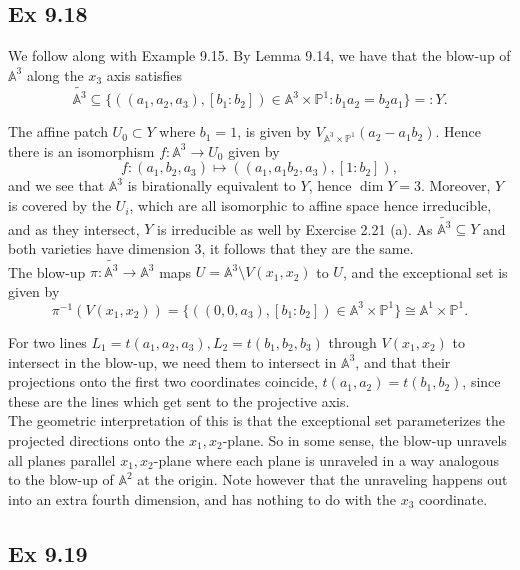 \documentclass{article}
\theoremstyle{definition}
\renewcommand{\P}{\mathbb{P}}
\newcommand{\A}{\mathbb{A}}
\renewcommand{\AA}[1]{\A^{#1}}
\newcommand{\PP}[1]{\P^{#1}}
\begin{document}
\subsection*{Ex 9.18}

We follow along with Example 9.15. By Lemma 9.14, we have that the blow-up of
$\AA{3}$ along the $x_3$ axis satisfies 
\[
	\widetilde{\AA{3}}
	\subseteq 
	\{ 
		((a_1, a_2, a_3), [b_1 : b_2]) \in \AA{3} \times \PP{1}
		:
		b_1a_2 = b_2 a_1
	\}
	=:
	Y.
\] 

The affine patch $U_0 \subset Y$ where $b_1 = 1$, is given by
$V_{\AA{3} \times \PP{1}}(a_2 - a_1 b_2)$. Hence there is an isomorphism 
$f : \AA{3} \to U_0$ given by
\[
	f : 
	(a_1, b_2, a_3) 
	\mapsto
	((a_1, a_1 b_2, a_3), [1 : b_2]),
\]
and we see that $\AA{3}$ is birationally equivalent to $Y$, hence $\dim Y = 3$.
Moreover, $Y$ is covered by the $U_i$, which are all isomorphic to affine space
hence irreducible, and as they intersect, $Y$ is irreducible as well by
Exercise 2.21 (a). As $\widetilde{\AA{3}} \subseteq Y$ and both varieties have
dimension $3$, it follows that they are the same. \\

The blow-up $\pi : \widetilde{\AA{3}} \to \AA{3}$ maps $U = \AA{3} \setminus
V(x_1, x_2)$ to $U$, and the exceptional set is given by
\[
	\pi^{-1}(V(x_1, x_2))
	=
	\{ 
		((0, 0, a_3), [b_1 : b_2]) \in \AA{3} \times \PP{1}
	\}
	\cong
	\AA{1} \times \PP{1}.
\]

For two lines $L_1 = t(a_1, a_2, a_3), L_2 = t(b_1, b_2, b_3)$ through
$V(x_1,x_2)$ to intersect in the blow-up, we need them to intersect in
$\AA{3}$, and that their projections onto the first two coordinates coincide,
$t(a_1, a_2) = t(b_1, b_2)$, since these are the lines which get sent to the
projective axis. \\

The geometric interpretation of this is that the exceptional set parameterizes
the projected directions onto the $x_1,x_2$-plane. So in some sense, the
blow-up unravels all planes parallel $x_1, x_2$-plane where each plane is
unraveled in a way analogous to the blow-up of $\AA{2}$ at the origin. Note
however that the unraveling happens out into an extra fourth dimension, and has
nothing to do with the $x_3$ coordinate.

\subsection*{Ex 9.19}
\end{document}
